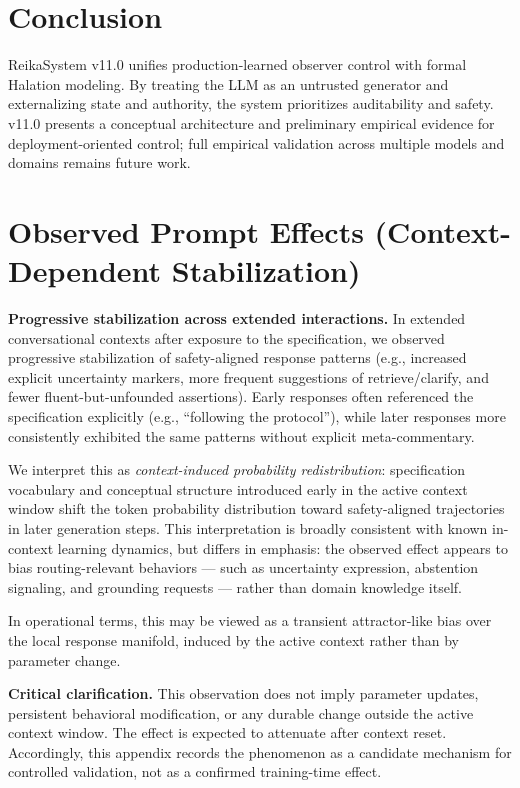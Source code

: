 \documentclass[11pt,a4paper]{article}
\begin{document}
\section{Conclusion}

ReikaSystem v11.0 unifies production-learned observer control with formal Halation modeling.
By treating the LLM as an untrusted generator and externalizing state and authority, the system
prioritizes auditability and safety. v11.0 presents a conceptual architecture and
preliminary empirical evidence for deployment-oriented control;
full empirical validation across multiple models and domains remains future work.

\appendix
\section{Observed Prompt Effects (Context-Dependent Stabilization)}

\textbf{Progressive stabilization across extended interactions.}
In extended conversational contexts after exposure to the specification, we observed
progressive stabilization of safety-aligned response patterns (e.g., increased explicit
uncertainty markers, more frequent suggestions of retrieve/clarify, and fewer
fluent-but-unfounded assertions). Early responses often referenced the specification
explicitly (e.g., ``following the protocol''), while later responses more consistently
exhibited the same patterns without explicit meta-commentary.

We interpret this as \textit{context-induced probability redistribution}: specification
vocabulary and conceptual structure introduced early in the active context window shift
the token probability distribution toward safety-aligned trajectories in later generation
steps. This interpretation is broadly consistent with known in-context learning dynamics,
but differs in emphasis: the observed effect appears to bias routing-relevant
behaviors --- such as uncertainty expression, abstention signaling, and grounding
requests --- rather than domain knowledge itself.

In operational terms, this may be viewed as a transient attractor-like bias over the
local response manifold, induced by the active context rather than by parameter change.

\textbf{Critical clarification.} This observation does not imply parameter updates,
persistent behavioral modification, or any durable change outside the active context
window. The effect is expected to attenuate after context reset. Accordingly, this
appendix records the phenomenon as a candidate mechanism for controlled validation,
not as a confirmed training-time effect.
\end{document}
